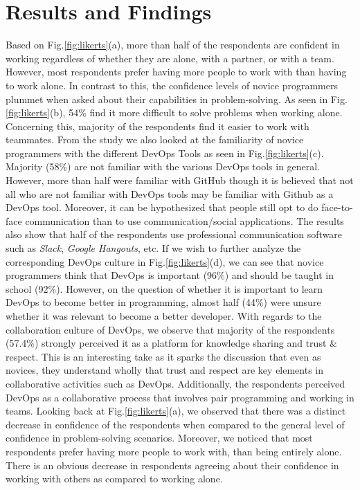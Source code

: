 \documentclass{sigchi}
\begin{document}
\section{Results and Findings}
Based on Fig.\ref{fig:likerts}(a), more than half of the respondents are confident in working regardless of whether they are alone, with a partner, or with a team. However, most respondents prefer having more people to work with than having to work alone.  In contrast to this, the confidence levels of novice programmers plummet when asked about their capabilities in problem-solving. As seen in Fig.\ref{fig:likerts}(b), 54\% find it more difficult to solve problems when working alone. Concerning this, majority of the respondents find it easier to work with teammates. From the study we also looked at the familiarity of novice programmers with the different DevOps Tools as seen in Fig.\ref{fig:likerts}(c). Majority (58\%) are not familiar with the various DevOps tools in general. However, more than half were familiar with GitHub though it is believed that not all who are not familiar with DevOps tools may be familiar with Github as a DevOps tool. Moreover, it can be hypothesized that people still opt to do face-to-face communication than to use communication/social applications. The results also show that half of the respondents use professional communication software such as \textit{Slack}, \textit{Google Hangouts}, etc. If we wish to further analyze the corresponding DevOps culture in Fig.\ref{fig:likerts}(d), we can see that novice programmers think that DevOps is important (96\%) and should be taught in school (92\%). However, on the question of whether it is important to learn DevOps to become better in programming, almost half (44\%) were unsure whether it was relevant to become a better developer. With regards to the collaboration culture of DevOps, we observe that majority of the respondents (57.4\%) strongly perceived it as a platform for knowledge sharing and trust \& respect. This is an interesting take as it sparks the discussion that even as novices, they understand wholly that trust and respect are key elements in collaborative activities such as DevOps. Additionally, the respondents perceived DevOps as a collaborative process that involves pair programming and working in teams. Looking back at Fig.\ref{fig:likerts}(a), we observed that there was a distinct decrease in confidence of the respondents when compared to the general level of confidence in problem-solving scenarios. Moreover, we noticed that most respondents prefer having more people to work with, than being entirely alone. There is an obvious decrease in respondents agreeing about their confidence in working with others as compared to working alone.
\end{document}
